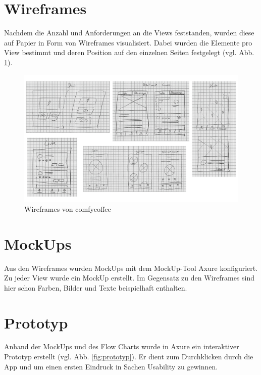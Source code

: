 \section{Wireframes}
Nachdem die Anzahl und Anforderungen an die Views feststanden, wurden diese auf Papier in Form von Wireframes visualisiert. Dabei wurden die Elemente pro View bestimmt und deren Position auf den einzelnen Seiten festgelegt (vgl. Abb. \ref{fig:wireframes}).

\begin{figure}[h!]
    \centering
		\includegraphics[width=\textwidth]{Bilder/wireframes.png}
		\caption{Wireframes von comfycoffee}
		\label{fig:wireframes}
\end{figure}

\newpage
\section{MockUps}
Aus den Wireframes wurden MockUps mit dem MockUp-Tool Axure konfiguriert. Zu jeder View wurde ein MockUp erstellt. Im Gegensatz zu den Wireframes sind hier schon Farben, Bilder und Texte beispielhaft enthalten.

\section{Prototyp}
Anhand der MockUps und des Flow Charts wurde in Axure ein interaktiver Prototyp erstellt (vgl. Abb. \ref{fig:prototyp}). Er dient zum Durchklicken durch die App und um einen ersten Eindruck in Sachen Usability zu gewinnen.


